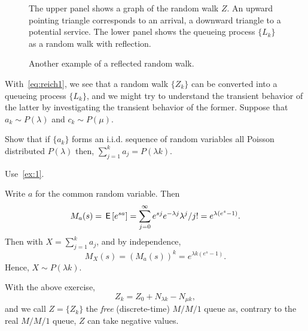 \begin{figure}[ht]
 \centering

%
\caption{The upper panel shows a graph of the random walk $Z$. An
 upward pointing triangle corresponds to an arrival, a downward
 triangle to a potential service. The lower panel shows the queueing
 process $\{L_k\}$ as a random walk with reflection.}
\label{fig:random_bernoulli}
\end{figure}

\begin{figure}[ht]
 \centering

\caption{Another example of a reflected random walk.}
\label{fig:random_walk}
\end{figure}


With~\cref{eq:reich1}, we see that a random walk $\{Z_k\}$ can be converted into a queueing process $\{L_k\}$, and we might try to understand the transient behavior of the latter by investigating the transient behavior of the former.
Suppose that $a_k\sim P(\lambda)$ and $c_k \sim P(\mu)$.

\begin{exercise}
  Show that if $\{a_k\}$ forms an i.i.d.
sequence of random variables all Poisson distributed $P(\lambda)$ then, $\sum_{j=1}^k a_j = P(\lambda k)$. 
\begin{hint}
Use~\cref{ex:1}.
\end{hint}
\begin{solution} Write $a$ for the common random variable. Then
  \begin{equation*}
    M_a(s) = \,\mathsf{E}\left[e^{sa}\right] = \sum_{j=0}^\infty e^{s j} e^{-\lambda j} \lambda^j/j! = e^{\lambda(e^{s}-1)}. 
  \end{equation*}
  Then with $X=\sum_{j=1}^k a_j$, and by independence, 
  \begin{equation*}
    M_X(s) = \left(M_a(s)\right)^k = e^{\lambda k (e^{s}-1)}. 
  \end{equation*}
  Hence, $X\sim P(\lambda k)$. 
\end{solution}
\end{exercise}


With the above exercise, 
\begin{equation*}
 Z_k = Z_0+N_{\lambda k} - N_{\mu k},
\end{equation*}
and we call $Z=\{Z_k\}$ the \emph{free} (discrete-time) $M/M/1$ queue as, contrary to the real $M/M/1$ queue, $Z$ can take negative values.

